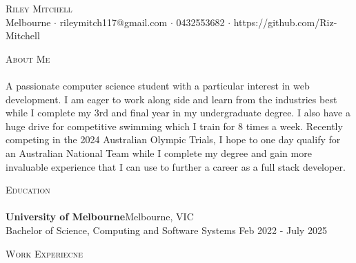 \documentclass[a4paper]{article}
\newcommand{\lineunder} {
    \vspace*{-8pt} \\
    \hspace*{-18pt} \hrulefill \\
}
\newcommand{\header} [1] {
    {\hspace*{-18pt}\vspace*{6pt} \textsc{#1}}
    \vspace*{-6pt} \lineunder
}
\begin{document}
\vspace*{-40pt}

    

\vspace*{-10pt}
\begin{center}
	{\Huge \scshape {Riley Mitchell}}\\
	Melbourne $\cdot$ rileymitch117@gmail.com $\cdot$ 0432553682 $\cdot$ https://github.com/Riz-Mitchell\\
\end{center}

\header{About Me}
A passionate computer science student with a particular interest in web development. I am eager to work along side and learn from the industries best while I complete my 3rd and final year in my undergraduate degree. I also have a huge drive for competitive swimming which I train for 8 times a week. Recently competing in the 2024 Australian Olympic Trials, I hope to one day qualify for an Australian National Team while I complete my degree and gain more invaluable experience that I can use to further a career as a full stack developer.
\vspace{2mm}

\header{Education}
\textbf{University of Melbourne}\hfill Melbourne, VIC\\
Bachelor of Science, Computing and Software Systems \hfill Feb 2022 - July 2025\\
\vspace{2mm}

\header{Work Experiecne}
\vspace{1mm}
\end{document}
